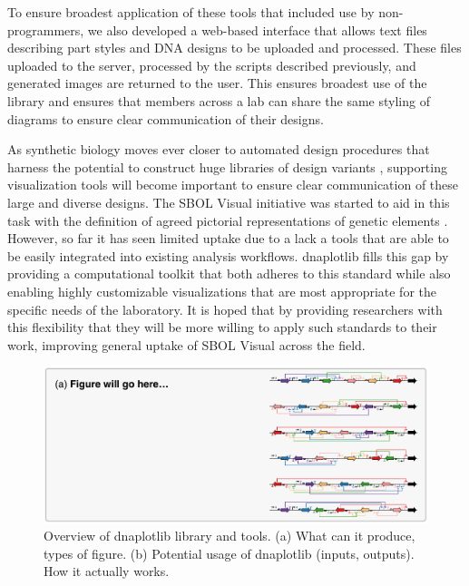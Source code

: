 \documentclass{bioinfo}
\begin{document}

To ensure broadest application of these tools that included use by non-programmers, we also developed a web-based interface that allows text files describing part styles and DNA designs to be uploaded and processed. These files uploaded to the server, processed by the scripts described previously, and generated images are returned to the user. This ensures broadest use of the library and ensures that members across a lab can share the same styling of diagrams to ensure clear communication of their designs.


As synthetic biology moves ever closer to automated design procedures that harness the potential to construct huge libraries of design variants \citep{Smanski14a,Bilitchenko11a}, supporting visualization tools will become important to ensure clear communication of these large and diverse designs. The SBOL Visual initiative was started to aid in this task with the definition of agreed pictorial representations of genetic elements \citep{Quinn13a}. However, so far it has seen limited uptake due to a lack a tools that are able to be easily integrated into existing analysis workflows. dnaplotlib fills this gap by providing a computational toolkit that both adheres to this standard while also enabling highly customizable visualizations that are most appropriate for the specific needs of the laboratory. It is hoped that by providing researchers with this flexibility that they will be more willing to apply such standards to their work, improving general uptake of SBOL Visual across the field.

\begin{figure}[t]
\centering
\includegraphics[width=\textwidth]{Figure1.pdf}
\caption{\label{fig:overview}Overview of dnaplotlib library and tools. (a) What can it produce, types of figure. (b) Potential usage of dnaplotlib (inputs, outputs). How it actually works.}
\end{figure}
\end{document}
